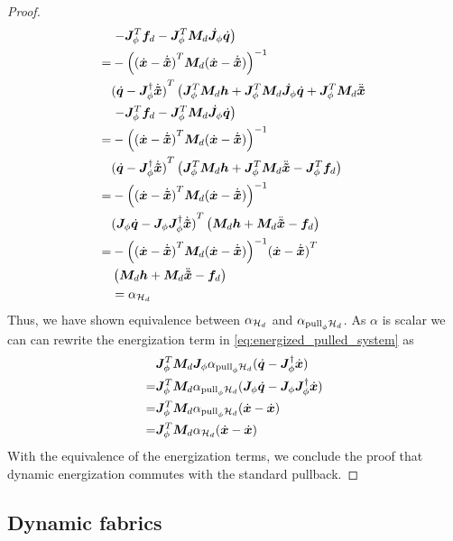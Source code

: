 \begin{proof}
\begin{align*}
    & \left.- \Jt\fd - \Jt\Md\Jdot\qdot\right) \\
    = & -{\left({(\xdot-\xtdot)}^T\Md(\xdot-\xtdot)\right)}^{-1} \\
    & {(\qdot-\pinv{\J}\xtdot)}^T\left(\Jt\Md\h + \Jt\Md\Jdot\qdot +\Jt\Md\xtddot\right. \\
    & \left.- \Jt\fd - \Jt\Md\Jdot\qdot\right) \\
    = & -{\left({(\xdot-\xtdot)}^T\Md(\xdot-\xtdot)\right)}^{-1} \\
    & {(\qdot-\pinv{\J}\xtdot)}^T\left(\Jt\Md\h + \Jt\Md\xtddot- \Jt\fd \right) \\
    = & -{\left({(\xdot-\xtdot)}^T\Md(\xdot-\xtdot)\right)}^{-1} \\
    & {(\J\qdot-\J\pinv{\J}\xtdot)}^T\left(\Md\h + \Md\xtddot- \fd \right) \\
    = & -{\left({(\xdot-\xtdot)}^T\Md(\xdot-\xtdot)\right)}^{-1}
    {(\xdot-\xtdot)}^T\\
    & \left(\Md\h + \Md\xtddot- \fd \right) \\
    & = \alpha_{\hd}
\end{align*}
Thus, we have shown equivalence between $\alpha_{\hd}$
and $\alpha_{\pull{\map}{\hd}}$. As $\alpha$ is scalar we can can rewrite the energization
term in \cref{eq:energized_pulled_system} as
\begin{align*}
  &\Jt\Md\J\alpha_{\pull{\map}{\hd}}(\qdot-\pinv{\J}\xdot)\\
  = &\Jt\Md\alpha_{\pull{\map}{\hd}}(\J\qdot-\J\pinv{\J}\xdot)\\
  = &\Jt\Md\alpha_{\pull{\map}{\hd}}(\xdot-\xdot)\\
  = &\Jt\Md\alpha_{\hd}(\xdot-\xdot)\\
\end{align*}
With the equivalence of the energization terms, we conclude the
proof that dynamic energization commutes with the standard pullback.
\end{proof}

\subsection{Dynamic fabrics}%
\label{sub:dynamic_fabrics}

